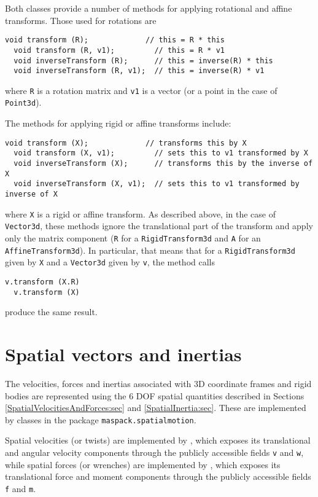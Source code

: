 Both classes provide a number of methods for applying rotational and
affine transforms. Those used for rotations are
%
\begin{lstlisting}[]
  void transform (R);             // this = R * this
  void transform (R, v1);         // this = R * v1
  void inverseTransform (R);      // this = inverse(R) * this
  void inverseTransform (R, v1);  // this = inverse(R) * v1
\end{lstlisting}
%
where {\tt R} is a rotation matrix and {\tt v1} is a vector (or a point
in the case of {\tt Point3d}).

The methods for applying rigid or affine transforms include:
\begin{lstlisting}[]
  void transform (X);             // transforms this by X         
  void transform (X, v1);         // sets this to v1 transformed by X
  void inverseTransform (X);      // transforms this by the inverse of X
  void inverseTransform (X, v1);  // sets this to v1 transformed by inverse of X
\end{lstlisting}
where {\tt X} is a rigid or affine transform.
As described above, in the case of {\tt Vector3d}, these methods
ignore the translational part of the transform and apply only the
matrix component ({\tt R} for a {\tt RigidTransform3d} and {\tt A} for
an {\tt AffineTransform3d}).
In particular, that means that for a {\tt RigidTransform3d} given by {\tt X}
and a {\tt Vector3d} given by {\tt v},
the method calls
%
\begin{lstlisting}[]
  v.transform (X.R)
  v.transform (X)
\end{lstlisting}
%
produce the same result.

\section{Spatial vectors and inertias}
\label{SpatialVectors:sec}

The velocities, forces and inertias associated with 3D coordinate
frames and rigid bodies are represented using the 6 DOF spatial
quantities described in Sections \ref{SpatialVelocitiesAndForces:sec}
and \ref{SpatialInertia:sec}. These are implemented by classes in the
package {\tt maspack.spatialmotion}.

Spatial velocities (or twists) are implemented by
, which exposes its
translational and angular velocity components through the publicly
accessible fields {\tt v} and {\tt w}, while spatial forces (or
wrenches) are implemented by
, which exposes its
translational force and moment components through the publicly
accessible fields {\tt f} and {\tt m}.

